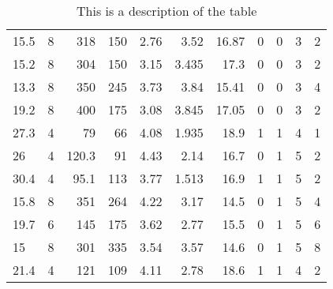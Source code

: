 \begin{table}[H]
\begin{subtable}[c]{1.1\linewidth}
\begin{tabular}{@{\extracolsep{6pt}}lrrrrrrrrrr}
15.5 & 8 & 318 & 150 & 2.76 & 3.52 & 16.87 & 0 & 0 & 3 & 2 \\
15.2 & 8 & 304 & 150 & 3.15 & 3.435 & 17.3 & 0 & 0 & 3 & 2 \\
13.3 & 8 & 350 & 245 & 3.73 & 3.84 & 15.41 & 0 & 0 & 3 & 4 \\
19.2 & 8 & 400 & 175 & 3.08 & 3.845 & 17.05 & 0 & 0 & 3 & 2 \\
27.3 & 4 & 79 & 66 & 4.08 & 1.935 & 18.9 & 1 & 1 & 4 & 1 \\
26 & 4 & 120.3 & 91 & 4.43 & 2.14 & 16.7 & 0 & 1 & 5 & 2 \\
30.4 & 4 & 95.1 & 113 & 3.77 & 1.513 & 16.9 & 1 & 1 & 5 & 2 \\
15.8 & 8 & 351 & 264 & 4.22 & 3.17 & 14.5 & 0 & 1 & 5 & 4 \\
19.7 & 6 & 145 & 175 & 3.62 & 2.77 & 15.5 & 0 & 1 & 5 & 6 \\
15 & 8 & 301 & 335 & 3.54 & 3.57 & 14.6 & 0 & 1 & 5 & 8 \\
21.4 & 4 & 121 & 109 & 4.11 & 2.78 & 18.6 & 1 & 1 & 4 & 2 \\
\end{tabular}
\vspace{5pt}
\bottomrule
{}
\end{subtable}
\caption{This is a description of the table}
\end{table}

